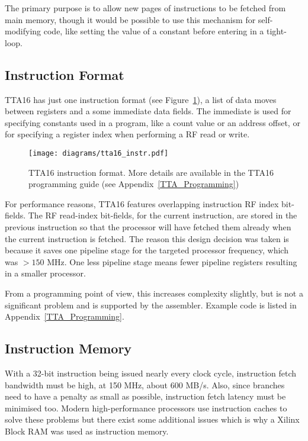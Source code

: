 The primary purpose is to allow new pages of instructions to be fetched from main
memory, though it would be possible to use this mechanism for self-modifying
code, like setting the value of a constant before entering in a tight-loop.


\subsection{Instruction Format}
TTA16 has just one instruction format (see Figure~\ref{TTA_Instruction_Format}),
a list of data moves between registers and a some immediate data fields. The
immediate is used for specifying constants used in a program, like a count
value or an address offset, or for specifying a register index when performing
a RF read or write.

\begin{figure}[h!]
\begin{center}
\texttt{[image: diagrams/tta16\_instr.pdf]}
\caption[TTA16 instruction format]{TTA16 instruction format. More details are
available in the TTA16 programming guide (see Appendix~\ref{TTA_Programming})}
\label{TTA_Instruction_Format}
\end{center}
\end{figure}

For performance reasons, TTA16 features overlapping instruction RF index
bit-fields. The RF read-index bit-fields, for the current instruction, are stored
in the previous instruction so that the processor will have fetched them already
when the current instruction is fetched. The reason this design decision was
taken is because it saves one pipeline stage for the targeted processor
frequency, which was $>150$ MHz. One less pipeline stage means fewer pipeline
registers resulting in a smaller processor.

From a programming point of view, this increases complexity slightly, but is not
a significant problem and is supported by the assembler. Example code is listed
in Appendix~\ref{TTA_Programming}.


\subsection{Instruction Memory}
\label{TTA_Instr_Mem}
With a 32-bit instruction being issued nearly every clock cycle, instruction
fetch bandwidth must be high, at 150 MHz, about 600 MB/s. Also, since branches
need to have a penalty as small as possible, instruction fetch latency must be
minimised too. Modern high-performance processors use instruction caches to
solve these problems but there exist some additional issues which is why a Xilinx
Block RAM was used
as instruction memory.

